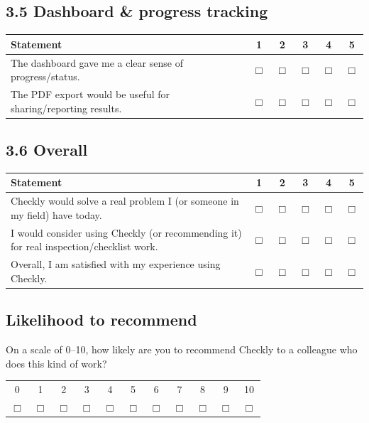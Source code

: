 \documentclass[11pt,a4paper]{article}
\begin{document}
\subsection*{3.5 Dashboard \& progress tracking}

\begin{tabularx}{\textwidth}{@{}YCCCCC@{}}
\toprule
Statement & 1 & 2 & 3 & 4 & 5\\
\midrule
The dashboard gave me a clear sense of progress/status. & $\Box$ & $\Box$ & $\Box$ & $\Box$ & $\Box$\\
The PDF export would be useful for sharing/reporting results. & $\Box$ & $\Box$ & $\Box$ & $\Box$ & $\Box$\\
\bottomrule
\end{tabularx}

\subsection*{3.6 Overall}

\begin{tabularx}{\textwidth}{@{}YCCCCC@{}}
\toprule
Statement & 1 & 2 & 3 & 4 & 5\\
\midrule
Checkly would solve a real problem I (or someone in my field) have today. & $\Box$ & $\Box$ & $\Box$ & $\Box$ & $\Box$\\
I would consider using Checkly (or recommending it) for real inspection/checklist work. & $\Box$ & $\Box$ & $\Box$ & $\Box$ & $\Box$\\
Overall, I am satisfied with my experience using Checkly. & $\Box$ & $\Box$ & $\Box$ & $\Box$ & $\Box$\\
\bottomrule
\end{tabularx}

\subsection*{Likelihood to recommend}

On a scale of 0--10, how likely are you to recommend Checkly to a colleague who does this kind of work?

\begin{center}
\begin{tabular}{*{11}{c}}
0 & 1 & 2 & 3 & 4 & 5 & 6 & 7 & 8 & 9 & 10\\
$\Box$ & $\Box$ & $\Box$ & $\Box$ & $\Box$ & $\Box$ & $\Box$ & $\Box$ & $\Box$ & $\Box$ & $\Box$\\
\end{tabular}
\end{center}
\end{document}
